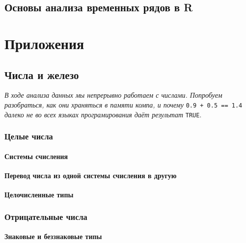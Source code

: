 \documentclass[
  letterpaper,
  DIV=11,
  numbers=noendperiod]{scrreprt}
\theoremstyle{definition}
\theoremstyle{remark}
\begin{document}

\chapter{Основы анализа временных рядов в R}\label{randan-timeseries}

\part{Приложения}


\chapter{Числа и железо}\label{appendix_numbers}

\emph{В ходе анализа данных мы непрерывно работаем с числами. Попробуем
разобраться, как они храняться в памяти компа, и почему}
\texttt{0.9\ +\ 0.5\ ==\ 1.4} \emph{далеко не во всех языках
програмирования даёт результат} \texttt{TRUE}.

\section{Целые числа}\label{integer_iron}

\subsection{Системы счисления}\label{number_systems}

\subsection{Перевод числа из одной системы счисления в
другую}\label{system_to_system}

\subsection{Целочисленные типы}\label{integer_types}

\section{Отрицательные числа}\label{negative_iron}

\subsection{Знаковые и беззнаковые типы}\label{unsigned_type}
\end{document}
